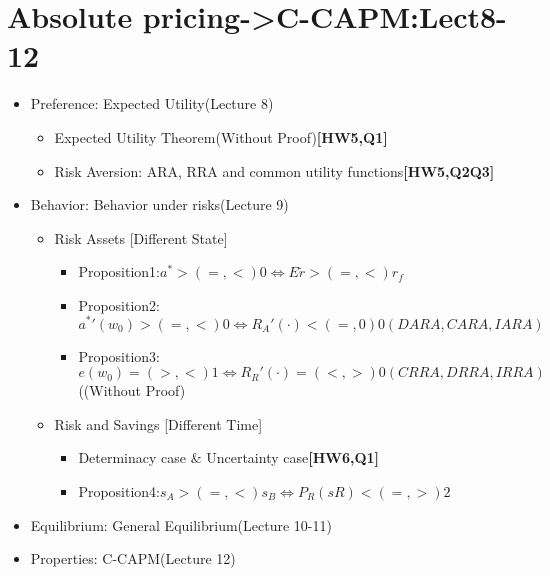 \documentclass{beamer}
\begin{document}
	\section{Absolute pricing->C-CAPM:Lect8-12}
	\label{sec:GE-Model}
	\begin{frame}
	\begin{itemize}
		\item Preference: Expected Utility(Lecture 8)
			\begin{itemize}
				\item Expected Utility Theorem(Without Proof)\textbf{[HW5,Q1]}
				\item Risk Aversion: ARA, RRA and common utility functions\textbf{[HW5,Q2Q3]}
			\end{itemize}
		\item Behavior: Behavior under risks(Lecture 9)
			\begin{itemize}
				\item Risk Assets [Different State]	
				\begin{itemize}
					\item Proposition1:$a^*>(=,<)0 \Leftrightarrow E\tilde{r}>(=,<)r_f$
					\item Proposition2:$a^*'(w_0)>(=,<)0 \Leftrightarrow R_A'(\cdot)<(=,0)0(DARA,CARA,IARA)$
					\item Proposition3:$e(w_0)=(>,<)1 \Leftrightarrow R_R'(\cdot)=(<,>)0(CRRA,DRRA,IRRA)$((Without Proof)
				\end{itemize}
				\item Risk and Savings [Different Time]
				\begin{itemize}
					\item Determinacy case \& Uncertainty case\textbf{[HW6,Q1]}
					\item Proposition4:$s_A>(=,<)s_B\Leftrightarrow P_R(sR)<(=,>)2$
				\end{itemize}
			\end{itemize}
		\item Equilibrium: General Equilibrium(Lecture 10-11)
		\item Properties: C-CAPM(Lecture 12)
	\end{itemize}
	\end{frame}
	
\end{document}
